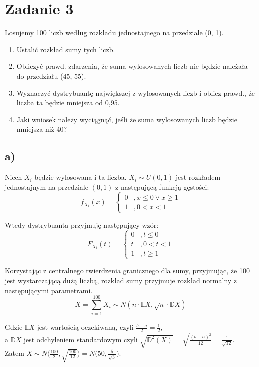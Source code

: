 \documentclass{article}
\begin{document}
\newpage
\section{Zadanie 3}

Losujemy 100 liczb według rozkładu jednostajnego na
przedziale (0, 1).
\begin{enumerate}[label = \alph*)]
\item Ustalić rozkład sumy tych liczb.
\item Obliczyć prawd. zdarzenia, że suma wylosowanych
liczb nie będzie należała do przedziału (45, 55).
\item Wyznaczyć dystrybuantę największej z wylosowanych
liczb i oblicz prawd., że liczba ta będzie mniejsza od 0,95.
\item Jaki wniosek należy wyciągnąć, jeśli że suma wylosowanych liczb będzie mniejsza niż 40?
\end{enumerate}

\subsection*{a)}
Niech $X_i$ będzie wylosowana i-ta liczba. $X_i \sim U(0,1)$ jest rozkładem jednostajnym na przedziale $(0,1)$ z następującą funkcją gęstości:
\[
f_{X_i}(x) = \left\{
\begin{array}{ll}
0 &, x \leq 0 \vee x \geq 1 \\
1 &, 0 < x < 1
\end{array}
\right. 
\]

Wtedy dystrybuanta przyjmuję następujący wzór:
\[
F_{X_i}(t) = \left\{
\begin{array}{ll}
0 &, t \leq 0 \\
t &, 0 < t < 1 \\
1 &, t \geq 1
\end{array}
\right. 
\]

Korzystając z centralnego twierdzenia granicznego dla sumy, przyjmując, że 100 jest wystarczającą dużą liczbą, rozkład sumy przyjmuje rozkład normalny z następującymi parametrami.
\[
X = \sum_{i=1}^{100}X_i \sim N(n\cdot\mathbb{E}X, \sqrt{n}\cdot\mathbb{D}X)
\]

Gdzie $\mathbb{E}X$ jest wartością oczekiwaną, czyli $\frac{b-a}{2} = \frac{1}{2}$, \\
a $\mathbb{D}X$ jest odchyleniem standardowym czyli $\sqrt{\mathbb{D}^2(X)} = \sqrt{\frac{(b-a)^2}{12} }= \frac{1}{\sqrt{12}}$. \\
Zatem $X \sim N\big( \frac{100}{2}, \sqrt{\frac{100}{12}} \big) = N\big(50, \frac{5}{\sqrt{3}} \big)$.
\end{document}
